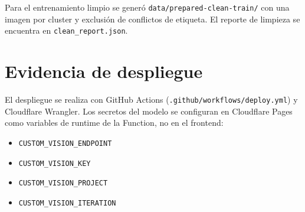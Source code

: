 Para el entrenamiento limpio se generó \texttt{data/prepared-clean-train/} con una
imagen por cluster y exclusión de conflictos de etiqueta. El reporte de limpieza se
encuentra en \texttt{clean\_report.json}.

\section{Evidencia de despliegue}

El despliegue se realiza con GitHub Actions (\texttt{.github/workflows/deploy.yml})
y Cloudflare Wrangler. Los secretos del modelo se configuran en Cloudflare Pages
como variables de runtime de la Function, no en el frontend:

\begin{itemize}
  \item \texttt{CUSTOM\_VISION\_ENDPOINT}
  \item \texttt{CUSTOM\_VISION\_KEY}
  \item \texttt{CUSTOM\_VISION\_PROJECT}
  \item \texttt{CUSTOM\_VISION\_ITERATION}
\end{itemize}
